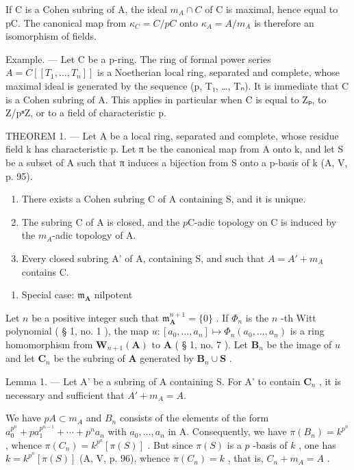 If C is a Cohen subring of A, the ideal \(m_{A} \cap C\) of C is maximal, hence equal to pC. The canonical map from \(\kappa_{C} = C/pC\) onto \(\kappa_{A} = A/m_{A}\) is therefore an isomorphism of fields.

Example. --- Let C be a p-ring. The ring of formal power series \(A = C[[T_{1}, \ldots, T_{n}]]\) is a Noetherian local ring, separated and complete, whose maximal ideal is generated by the sequence (p, T₁, \ldots, Tₙ). It is immediate that C is a Cohen subring of A. This applies in particular when C is equal to Zₚ, to Z/pⁿZ, or to a field of characteristic p.

THEOREM 1. — Let A be a local ring, separated and complete, whose residue field k has characteristic p. Let π be the canonical map from A onto k, and let S be a subset of A such that π induces a bijection from S onto a p-basis of k (A, V, p. 95).

\begin{enumerate}
\def\labelenumi{\alph{enumi})}
\item
  There exists a Cohen subring C of A containing S, and it is unique.
\item
  The subring C of A is closed, and the \(p\)C-adic topology on C is induced by the \(m_{A}\)-adic topology of A.
\item
  Every closed subring A' of A, containing S, and such that \(A = A' + m_{A}\) contains C.
\end{enumerate}

\begin{enumerate}
\def\labelenumi{\Alph{enumi})}
\tightlist
\item
  Special case: \(\mathfrak{m}_{\mathbf{A}}\) nilpotent
\end{enumerate}

Let \(n\) be a positive integer such that \(\mathfrak{m}_{\mathbf{A}}^{n+1}=\{0\}\) . If \(\Phi_{n}\) is the \(n\) -th Witt polynomial ( § 1, no. 1 ), the map \(u:[a_{0},..., a_{n}]\mapsto\Phi_{n}(a_{0},..., a_{n})\) is a ring homomorphism from \(\mathbf{W}_{n+1}(\mathbf{A})\) to \(\mathbf{A}\) ( § 1, no. 7 ). Let \(\mathbf{B}_{n}\) be the image of \(u\) and let \(\mathbf{C}_{n}\) be the subring of \(\mathbf{A}\) generated by \(\mathbf{B}_{n}\cup\mathbf{S}\) .

Lemma 1. --- Let A' be a subring of A containing S. For A' to contain \(\mathbf{C}_{n}\) , it is necessary and sufficient that \(A' + m_{A} = A\).

We have \(pA \subset m_A\) and \(B_n\) consists of the elements of the form \(a_0^{p^n} + pa_1^{p^{n-1}} + \cdots + p^n a_n\) with \(a_0, \ldots, a_n\) in A. Consequently, we have \(\pi(B_n) = k^{p^n}\) , whence \(\pi(C_n) = k^{p^n}[\pi(S)]\) . But since \(\pi(S)\) is a \(p\) -basis of \(k\) , one has \(k = k^{p^n}[\pi(S)]\) (A, V, p. 96), whence \(\pi(C_n) = k\) , that is, \(C_n + m_A = A\) .

